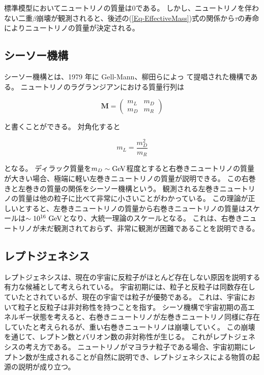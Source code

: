 \documentclass[a4paper,10pt]{jreport}
\begin{document}
標準模型においてニュートリノの質量は0である。
しかし、ニュートリノを伴わない二重$\beta$崩壊が観測されると、後述の(\ref{Eq-EffectiveMass})式の関係から$\tau$の寿命によりニュートリノの質量が決定される。




\subsection{シーソー機構}

シーソー機構とは、1979 年に Gell-Mann、柳田らによっ て提唱された機構である。
ニュートリノのラグランジアンにおける質量行列は

\begin{equation} \label{Eq-MassMatrix}
	\bm{M} =
	\left(
		\begin{array}{cc}
		m_L & m_D \\
		m_D & m_R
		\end{array}
	\right)
\end{equation}

と書くことができる。
対角化すると

\begin{equation} \label{Eq-Seesaw}
	m_L=\frac{m_D^2}{m_R}
\end{equation}

となる。
ディラック質量を$m_D\sim\rm{GeV}$程度とすると右巻きニュートリノの質量が大きい場合、極端に軽い左巻きニュートリノの質量が説明できる。
この右巻きと左巻きの質量の関係をシーソー機構という。
観測される左巻きニュートリノの質量は他の粒子に比べて非常に小さいことがわかっている。
この理論が正しいとすると、左巻きニュートリノの質量から右巻きニュートリノの質量はスケールは$\sim 10^{16}\  \rm{GeV}$となり、大統一理論のスケールとなる。
これは、右巻きニュートリノが未だ観測されておらず、非常に観測が困難であることを説明できる。




\subsection{レプトジェネシス}

レプトジェネシスは、現在の宇宙に反粒子がほとんど存在しない原因を説明する有力な候補として考えられている。
宇宙初期には、粒子と反粒子は同数存在していたとされているが、現在の宇宙では粒子が優勢である。
これは、宇宙において粒子と反粒子は非対称性を持つことを指す。
シーソ機構で宇宙初期の高エネルギー状態を考えると、右巻きニュートリノが左巻きニュートリノ同様に存在していたと考えられるが、重い右巻きニュートリノは崩壊していく。
この崩壊を通じて、レプトン数とバリオン数の非対称性が生じる。
これがレプトジェネシスの考え方である。
ニュートリノがマヨラナ粒子である場合、宇宙初期にレプトン数が生成されることが自然に説明でき、レプトジェネシスによる物質の起源の説明が成り立つ。
\end{document}
